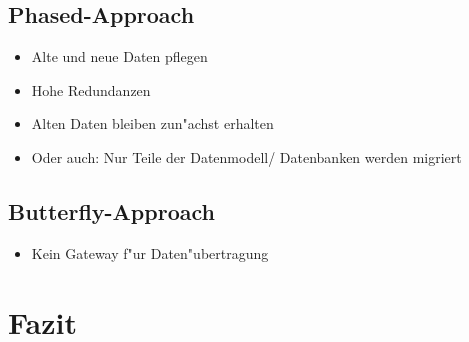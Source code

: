 \documentclass[11pt]{scrartcl}
\newif\iffull
\begin{document}
\subsection{Phased-Approach}

\begin{itemize}
	\item Alte und neue Daten pflegen
	\item Hohe Redundanzen
	\item Alten Daten bleiben zun"achst erhalten
	\item Oder auch: Nur Teile der Datenmodell/ Datenbanken werden migriert
\end{itemize}

\subsection{Butterfly-Approach}

\begin{itemize}
	\item Kein Gateway f"ur Daten"ubertragung
\end{itemize}

\section{Fazit}

\iffull
\newpage

\addcontentsline{toc}{section}{\bibname}


\fi
\end{document}
